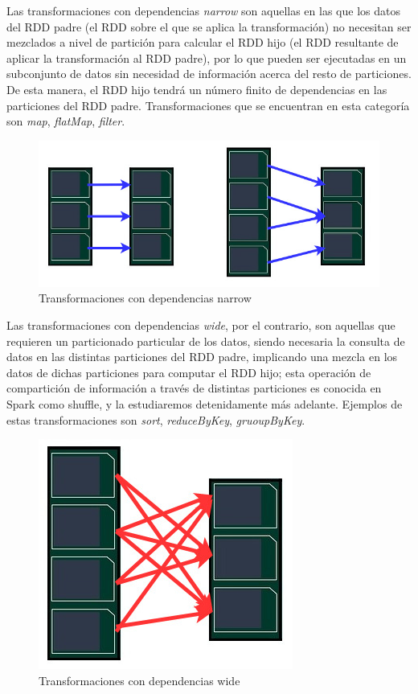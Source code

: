 Las transformaciones con dependencias \textit{narrow} son aquellas en las que los datos del RDD padre (el RDD sobre el que se aplica la transformación) no necesitan ser mezclados a nivel de partición para calcular el RDD hijo (el RDD resultante de aplicar la transformación al RDD padre), por lo que pueden ser ejecutadas en un subconjunto de datos sin necesidad de información acerca del resto de particiones. De esta manera, el RDD hijo tendrá un número finito de dependencias en las particiones del RDD padre. Transformaciones que se encuentran en esta categoría son \textit{map}, \textit{flatMap}, \textit{filter}.\\
\begin{figure}[H]
	\includegraphics[scale=0.6]{img/narrow}
	\caption{Transformaciones con dependencias narrow}
	\label{foto}
\end{figure}
 
Las transformaciones con dependencias \textit{wide}, por el contrario, son aquellas que requieren un particionado particular de los datos, siendo necesaria la consulta de datos en las distintas particiones del RDD padre, implicando una mezcla en los datos de dichas particiones para computar el RDD hijo; esta operación de compartición de información a través de distintas particiones es conocida en Spark como shuffle, y la estudiaremos detenidamente más adelante. Ejemplos de estas transformaciones son \textit{sort}, \textit{reduceByKey}, \textit{gruoupByKey}.\\
\begin{figure}[H]
	\includegraphics[scale=0.6]{img/wide}
	\centering
	\caption{Transformaciones con dependencias wide}
	\label{foto}
\end{figure}

